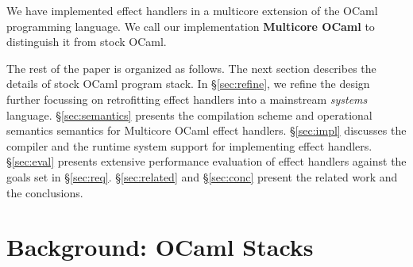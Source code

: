 \documentclass[sigplan,10pt,review,anonymous]{acmart}\settopmatter{printfolios=true,printccs=false,printacmref=false}
\begin{document}
We have implemented effect handlers in a multicore extension of the OCaml
programming language. We call our implementation \textbf{Multicore OCaml} to
distinguish it from stock OCaml.

The rest of the paper is organized as follows. The next section describes the
details of stock OCaml program stack. In \S\ref{sec:refine}, we refine the
design further focussing on retrofitting effect handlers into a mainstream
\emph{systems} language. \S\ref{sec:semantics} presents the compilation scheme
and operational semantics semantics for Multicore OCaml effect handlers.
\S\ref{sec:impl} discusses the compiler and the runtime system support for
implementing effect handlers. \S\ref{sec:eval} presents extensive performance
evaluation of effect handlers against the goals set in \S\ref{sec:req}.
\S\ref{sec:related} and \S\ref{sec:conc} present the related work and the
conclusions.

\section{Background: OCaml Stacks}
\label{sec:stack}
\end{document}
